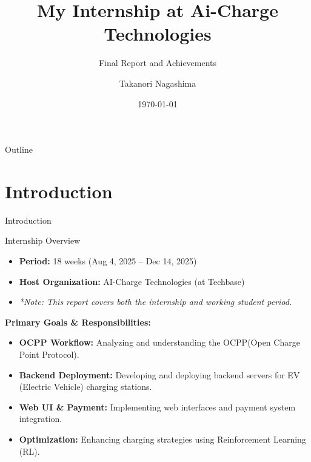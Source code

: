 \documentclass[11pt]{beamer}
\title[Internship Presentation]{My Internship at Ai-Charge Technologies}
\subtitle{Final Report and Achievements}
\author{Takanori Nagashima}
\institute{OTH Regensburg / International Computer Science}
\date{\today}
\begin{document}

\begin{frame}
    \titlepage
\end{frame}

\begin{frame}{Outline}
    \tableofcontents
\end{frame}



\section{Introduction}

\begin{frame}{Introduction}
    \begin{block}{Internship Overview}
        \begin{itemize}
            \item \textbf{Period:} 18 weeks (Aug 4, 2025 -- Dec 14, 2025)
            \item \textbf{Host Organization:} AI-Charge Technologies (at Techbase)
            \item \textit{*Note: This report covers both the internship and working student period.}
        \end{itemize}
    \end{block}

    \vspace{0.3cm}
    
    \textbf{Primary Goals \& Responsibilities:}
    \begin{itemize}
        \item[\ding{51}] \textbf{OCPP Workflow:} Analyzing and understanding the OCPP(Open Charge Point Protocol).
        \item[\ding{51}] \textbf{Backend Deployment:} Developing and deploying backend servers for EV (Electric Vehicle) charging stations.
        \item[\ding{51}] \textbf{Web UI \& Payment:} Implementing web interfaces and payment system integration.
        \item[\ding{51}] \textbf{Optimization:} Enhancing charging strategies using Reinforcement Learning (RL).
    \end{itemize}    
\end{frame}
\end{document}
